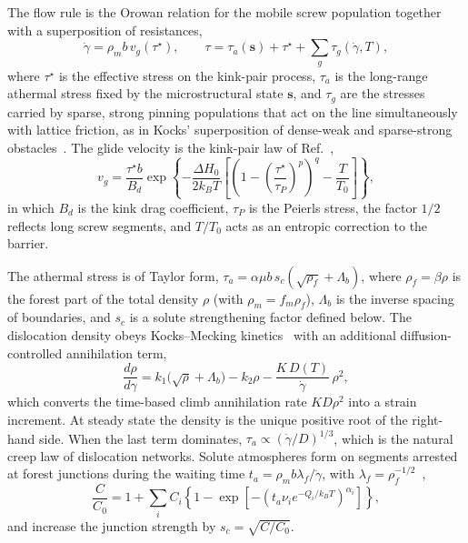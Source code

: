 \documentclass[aps,prl,twocolumn,superscriptaddress,amsmath,amssymb,floatfix]{revtex4-2}
\newcommand{\gd}{\dot\gamma}
\newcommand{\ts}{\tau^{\star}}
\newcommand{\kT}{k_BT}
\begin{document}
The flow rule is the Orowan relation for the mobile screw population together with a superposition of resistances,
\begin{equation}
\gd=\rho_m b\,v_g(\ts),\qquad \tau=\tau_a(\bm s)+\ts+\sum_g\tau_g(\gd,T),
\label{eq:flow}
\end{equation}
where $\ts$ is the effective stress on the kink-pair process, $\tau_a$ is the long-range athermal stress fixed by the microstructural state $\bm s$, and $\tau_g$ are the stresses carried by sparse, strong pinning populations that act on the line simultaneously with lattice friction, as in Kocks' superposition of dense-weak and sparse-strong obstacles~\cite{KocksArgonAshby}. The glide velocity is the kink-pair law of Ref.~\cite{Po2016},
\begin{equation}
v_g=\frac{\ts b}{B_d}\exp\!\left\{-\frac{\Delta H_0}{2\kT}\left[\left(1-\left(\frac{\ts}{\tau_P}\right)^{p}\right)^{q}-\frac{T}{T_0}\right]\right\},
\label{eq:vg}
\end{equation}
in which $B_d$ is the kink drag coefficient, $\tau_P$ is the Peierls stress, the factor $1/2$ reflects long screw segments, and $T/T_0$ acts as an entropic correction to the barrier.

The athermal stress is of Taylor form, $\tau_a=\alpha\mu b\,s_c(\sqrt{\rho_f}+\Lambda_b)$, where $\rho_f=\beta\rho$ is the forest part of the total density $\rho$ (with $\rho_m=f_m\rho_f$), $\Lambda_b$ is the inverse spacing of boundaries, and $s_c$ is a solute strengthening factor defined below. The dislocation density obeys Kocks--Mecking kinetics~\cite{MeckingKocks} with an additional diffusion-controlled annihilation term,
\begin{equation}
\frac{d\rho}{d\gamma}=k_1\big(\sqrt\rho+\Lambda_b\big)-k_2\rho-\frac{K\,D(T)}{\gd}\,\rho^2 ,
\label{eq:km}
\end{equation}
which converts the time-based climb annihilation rate $K D\rho^2$ into a strain increment. At steady state the density is the unique positive root of the right-hand side. When the last term dominates, $\tau_a\propto(\gd/D)^{1/3}$, which is the natural creep law of dislocation networks. Solute atmospheres form on segments arrested at forest junctions during the waiting time $t_a=\rho_m b\lambda_f/\gd$, with $\lambda_f=\rho_f^{-1/2}$~\cite{CottrellBilby,Louat1981,Cheng2001},
\begin{equation}
\frac{C}{C_0}=1+\sum_iC_i\left\{1-\exp\!\left[-\left(t_a\nu_ie^{-Q_i/\kT}\right)^{\alpha_i}\right]\right\},
\label{eq:aging}
\end{equation}
and increase the junction strength by $s_c=\sqrt{C/C_0}$.
\end{document}
